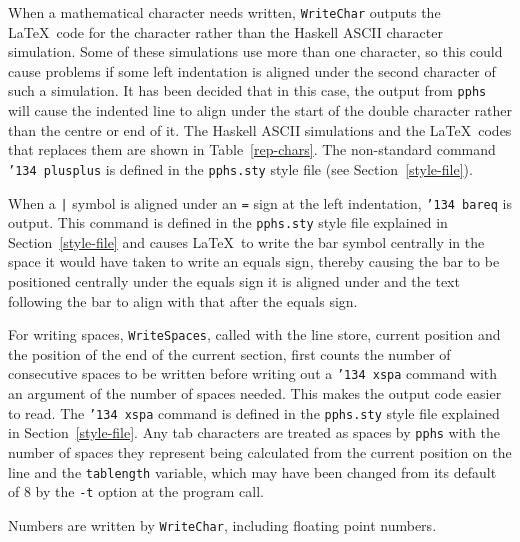 When a mathematical character needs written, {\tt WriteChar} outputs the \LaTeX\ code for
the character rather than the Haskell ASCII character simulation.  Some of these
simulations use more than one character, so this could cause problems if some left
indentation is aligned under the second character of such a simulation.  It has been
decided that in this case, the output from {\tt pphs} will cause the indented line
to align under the start of the double character rather than the centre or end of it.
The Haskell ASCII simulations and the \LaTeX\ codes that replaces them are shown in
Table~\ref{rep-chars}.  The non-standard command {\tt \char'134 plusplus} is defined
in the {\tt pphs.sty} style file (see Section~\ref{style-file}).

When a {\tt |} symbol is aligned under an {\tt =} sign at the left indentation,
{\tt \char'134 bareq} is output.  This command is defined in the {\tt pphs.sty}
style file explained in Section~\ref{style-file} and causes \LaTeX\ to write the bar symbol
centrally in the space it would have taken to write an equals sign, thereby causing
the bar to be positioned centrally under the equals sign it is aligned under and the text
following the bar to align with that after the equals sign.

For writing spaces, {\tt WriteSpaces}, called with the line store, current position and the
position of the end of the current section, first counts the number of consecutive spaces
to be written before writing out a {\tt \char'134 xspa} command with an argument of
the number of spaces needed.  This makes the output code easier to read.  The
{\tt \char'134 xspa} command is defined in the {\tt pphs.sty} style file explained
in Section~\ref{style-file}.  Any tab characters are treated as spaces by {\tt pphs}
with the number of spaces they represent being calculated from the current position
on the line and the {\tt tablength} variable, which may have been changed from its
default of 8 by the {\tt -t} option at the program call.

Numbers are written by {\tt WriteChar}, including floating point numbers.

